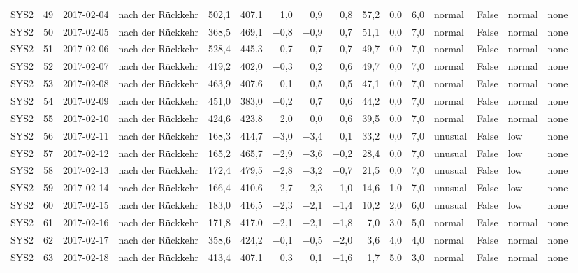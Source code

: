 \begin{tabular}{lrllrrrrrrrrlrll}
SYS2 & 49 & 2017-02-04 & nach der Rückkehr & 502,1 & 407,1 & 1,0 & 0,9 & 0,8 & 57,2 & 0,0 & 6,0 & normal & False & normal & none \\
SYS2 & 50 & 2017-02-05 & nach der Rückkehr & 368,5 & 469,1 & $-$0,8 & $-$0,9 & 0,7 & 51,1 & 0,0 & 7,0 & normal & False & normal & none \\
SYS2 & 51 & 2017-02-06 & nach der Rückkehr & 528,4 & 445,3 & 0,7 & 0,7 & 0,7 & 49,7 & 0,0 & 7,0 & normal & False & normal & none \\
SYS2 & 52 & 2017-02-07 & nach der Rückkehr & 419,2 & 402,0 & $-$0,3 & 0,2 & 0,6 & 49,7 & 0,0 & 7,0 & normal & False & normal & none \\
SYS2 & 53 & 2017-02-08 & nach der Rückkehr & 463,9 & 407,6 & 0,1 & 0,5 & 0,5 & 47,1 & 0,0 & 7,0 & normal & False & normal & none \\
SYS2 & 54 & 2017-02-09 & nach der Rückkehr & 451,0 & 383,0 & $-$0,2 & 0,7 & 0,6 & 44,2 & 0,0 & 7,0 & normal & False & normal & none \\
SYS2 & 55 & 2017-02-10 & nach der Rückkehr & 424,6 & 423,8 & 2,0 & 0,0 & 0,6 & 39,5 & 0,0 & 7,0 & normal & False & normal & none \\
SYS2 & 56 & 2017-02-11 & nach der Rückkehr & 168,3 & 414,7 & $-$3,0 & $-$3,4 & 0,1 & 33,2 & 0,0 & 7,0 & unusual & False & low & none \\
SYS2 & 57 & 2017-02-12 & nach der Rückkehr & 165,2 & 465,7 & $-$2,9 & $-$3,6 & $-$0,2 & 28,4 & 0,0 & 7,0 & unusual & False & low & none \\
SYS2 & 58 & 2017-02-13 & nach der Rückkehr & 172,4 & 479,5 & $-$2,8 & $-$3,2 & $-$0,7 & 21,5 & 0,0 & 7,0 & unusual & False & low & none \\
SYS2 & 59 & 2017-02-14 & nach der Rückkehr & 166,4 & 410,6 & $-$2,7 & $-$2,3 & $-$1,0 & 14,6 & 1,0 & 7,0 & unusual & False & low & none \\
SYS2 & 60 & 2017-02-15 & nach der Rückkehr & 183,0 & 416,5 & $-$2,3 & $-$2,1 & $-$1,4 & 10,2 & 2,0 & 6,0 & unusual & False & low & none \\
SYS2 & 61 & 2017-02-16 & nach der Rückkehr & 171,8 & 417,0 & $-$2,1 & $-$2,1 & $-$1,8 & 7,0 & 3,0 & 5,0 & normal & False & normal & none \\
SYS2 & 62 & 2017-02-17 & nach der Rückkehr & 358,6 & 424,2 & $-$0,1 & $-$0,5 & $-$2,0 & 3,6 & 4,0 & 4,0 & normal & False & normal & none \\
SYS2 & 63 & 2017-02-18 & nach der Rückkehr & 413,4 & 407,1 & 0,3 & 0,1 & $-$1,6 & 1,7 & 5,0 & 3,0 & normal & False & normal & none \\

\end{tabular}
